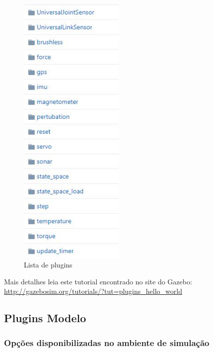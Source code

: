 \begin{figure}[H]
\centering
\includegraphics[width=0.45\textwidth]{figuras/plugins.JPG}
\caption{Lista de plugins}
\label{plugins.JPG}
\end{figure}

Mais detalhes leia este tutorial encontrado no site do Gazebo: \url{http://gazebosim.org/tutorials/?tut=plugins\_hello\_world}

\subsection{Plugins Modelo}

\subsubsection{Opções disponibilizadas no ambiente de simulação}

